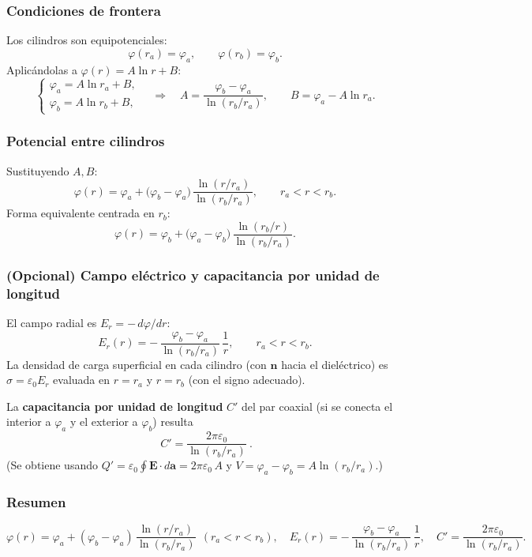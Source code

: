 \documentclass{article}
\begin{document}
\subsubsection*{Condiciones de frontera}
Los cilindros son equipotenciales:
\[
\varphi(r_a)=\varphi_a,\qquad \varphi(r_b)=\varphi_b.
\]
Aplicándolas a $\varphi(r)=A\ln r+B$:
\[
\begin{cases}
\varphi_a=A\ln r_a+B,\\
\varphi_b=A\ln r_b+B,
\end{cases}
\quad\Longrightarrow\quad
A=\dfrac{\varphi_b-\varphi_a}{\ln(r_b/r_a)},\qquad
B=\varphi_a-A\ln r_a.
\]

\subsubsection*{Potencial entre cilindros}
Sustituyendo $A,B$:
\[
\boxed{\ 
\varphi(r)
=\varphi_a+\big(\varphi_b-\varphi_a\big)\,
\frac{\ln(r/r_a)}{\ln(r_b/r_a)},
\qquad r_a<r<r_b.\
}
\]
Forma equivalente centrada en $r_b$:
\[
\varphi(r)=\varphi_b+\big(\varphi_a-\varphi_b\big)\,
\frac{\ln(r_b/r)}{\ln(r_b/r_a)}.
\]

\subsubsection*{(Opcional) Campo eléctrico y capacitancia por unidad de longitud}
El campo radial es $E_r=-\,d\varphi/dr$:
\[
\boxed{\ 
E_r(r)=-\,\frac{\varphi_b-\varphi_a}{\ln(r_b/r_a)}\,\frac{1}{r},\qquad r_a<r<r_b.\
}
\]
La densidad de carga superficial en cada cilindro (con $\hat{\mathbf n}$ hacia el dieléctrico) es $\sigma=\varepsilon_0 E_r$ evaluada en $r=r_a$ y $r=r_b$ (con el signo adecuado).

La \textbf{capacitancia por unidad de longitud} $C'$ del par coaxial (si se conecta el interior a $\varphi_a$ y el exterior a $\varphi_b$) resulta
\[
\boxed{\ C'=\frac{2\pi\varepsilon_0}{\ln(r_b/r_a)}\ }.
\]
(Se obtiene usando $Q'= \varepsilon_0 \oint \mathbf E\!\cdot\!d\mathbf a = 2\pi\varepsilon_0\,A$ y $V=\varphi_a-\varphi_b=A\ln(r_b/r_a)$.)

\subsubsection*{Resumen}
\[
\boxed{
\varphi(r)=\varphi_a+(\varphi_b-\varphi_a)\,\dfrac{\ln(r/r_a)}{\ln(r_b/r_a)}\ \ (r_a<r<r_b),\quad
E_r(r)=-\,\dfrac{\varphi_b-\varphi_a}{\ln(r_b/r_a)}\,\dfrac{1}{r},\quad
C'=\dfrac{2\pi\varepsilon_0}{\ln(r_b/r_a)}.}
\]
\end{document}

